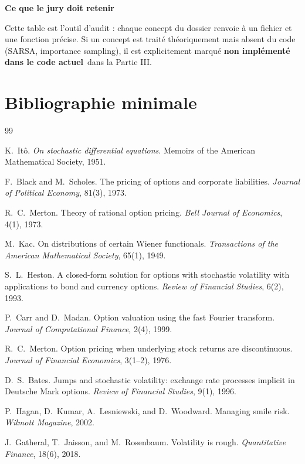 \documentclass[11pt,a4paper]{report}
\theoremstyle{definition}
\theoremstyle{plain}
\theoremstyle{remark}
\newcommand{\1}{\mathbf{1}}
\newcommand{\NonImplem}{\textbf{non implémenté dans le code actuel}}
\newenvironment{jurybox}{
\par\medskip
\begin{lrbox}{\juryboxbox}
\begin{minipage}{0.97\textwidth}
\textbf{Ce que le jury doit retenir}\par\smallskip
\ignorespaces
}{
\unskip\end{minipage}
\end{lrbox}
\noindent\fcolorbox{black!30}{black!3}{\usebox{\juryboxbox}}
\par\medskip
}
\begin{document}
\begin{jurybox}
Cette table est l'outil d'audit : chaque concept du dossier renvoie à un fichier et une fonction précise. Si un concept est traité théoriquement mais absent du code (SARSA, importance sampling), il est explicitement marqué \NonImplem\ dans la Partie III.
\end{jurybox}

\chapter{Bibliographie minimale}

\begin{thebibliography}{99}

K.\ Itô.
\newblock \emph{On stochastic differential equations}.
\newblock Memoirs of the American Mathematical Society, 1951.

F.\ Black and M.\ Scholes.
\newblock The pricing of options and corporate liabilities.
\newblock \emph{Journal of Political Economy}, 81(3), 1973.

R.\ C.\ Merton.
\newblock Theory of rational option pricing.
\newblock \emph{Bell Journal of Economics}, 4(1), 1973.

M.\ Kac.
\newblock On distributions of certain {W}iener functionals.
\newblock \emph{Transactions of the American Mathematical Society}, 65(1), 1949.

S.\ L.\ Heston.
\newblock A closed-form solution for options with stochastic volatility with applications to bond and currency options.
\newblock \emph{Review of Financial Studies}, 6(2), 1993.

P.\ Carr and D.\ Madan.
\newblock Option valuation using the fast {F}ourier transform.
\newblock \emph{Journal of Computational Finance}, 2(4), 1999.

R.\ C.\ Merton.
\newblock Option pricing when underlying stock returns are discontinuous.
\newblock \emph{Journal of Financial Economics}, 3(1--2), 1976.

D.\ S.\ Bates.
\newblock Jumps and stochastic volatility: exchange rate processes implicit in {D}eutsche {M}ark options.
\newblock \emph{Review of Financial Studies}, 9(1), 1996.

P.\ Hagan, D.\ Kumar, A.\ Lesniewski, and D.\ Woodward.
\newblock Managing smile risk.
\newblock \emph{Wilmott Magazine}, 2002.

J.\ Gatheral, T.\ Jaisson, and M.\ Rosenbaum.
\newblock Volatility is rough.
\newblock \emph{Quantitative Finance}, 18(6), 2018.

\end{thebibliography}
\end{document}
